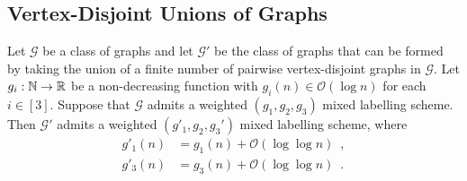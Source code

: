 \documentclass{patmorin}
\newcommand{\Oh}{\calO}
\newcommand{\calG}{\mathcal{G}}
\newcommand{\calO}{\mathcal{O}}
\begin{document}
\subsection{Vertex-Disjoint Unions of Graphs}



\begin{lem}\label{disjoint_union_ii}
    Let $\calG$ be a class of graphs and let $\calG'$ be the class of graphs that can be formed by taking the union of a finite number of pairwise vertex-disjoint graphs in $\calG$. 
    Let $g_i:\mathbb{N}\to\mathbb{R}$ be a non-decreasing function  with $g_i(n)\in \Oh(\log n)$ for each $i\in[3]$.    
    Suppose that $\calG$ admits a weighted $(g_1,g_2,g_3)$ mixed labelling scheme. 
    Then $\calG'$ admits a weighted $(g'_1,g_2,g_3')$ mixed labelling scheme, where
    \begin{align*}
        g'_1(n) & = g_1(n)+\Oh(\log\log n)\enspace, \\
        g'_3(n) & = g_3(n)+\Oh(\log\log n) \enspace .
    \end{align*}
  \end{lem}
\end{document}
